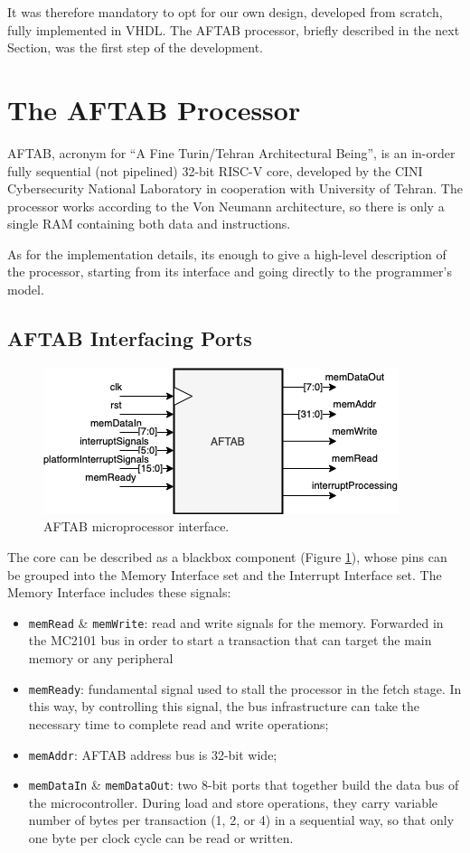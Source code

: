 It was therefore mandatory to opt for our own design, developed from scratch, fully implemented in VHDL. The AFTAB processor, briefly described in the next Section, was the first step of the development.

\section{The AFTAB Processor}
AFTAB, acronym for ``A Fine Turin/Tehran Architectural Being'', is an in-order fully sequential (not pipelined) 32-bit RISC-V core, developed by the CINI Cybersecurity National Laboratory in cooperation with University of Tehran. The processor works according to the Von Neumann architecture, so there is only a single RAM containing both data and instructions.

As for the implementation details, its enough to give a high-level description of the processor, starting from its interface and going directly to the programmer's model.
\subsection{AFTAB Interfacing Ports}

\begin{figure}[h!]
\vspace{0.5cm}
\includegraphics[scale=0.9]{./images/aftabpins}
\caption{AFTAB microprocessor interface.}
\label{fig:aftabpin} %
\end{figure}

The core can be described as a blackbox component (Figure \ref{fig:aftabpin}), whose pins can be grouped into the Memory Interface set and the Interrupt Interface set. The Memory Interface includes these signals:

\begin{itemize}
\item \texttt{memRead} \& \texttt{memWrite}: read and write signals for the memory. Forwarded in the MC2101 bus in order to start a transaction that can target the main memory or any peripheral
\item \texttt{memReady}: fundamental signal used to stall the processor in the fetch stage. In this way, by controlling this signal, the bus infrastructure can take the necessary time to complete read and write operations;
\item \texttt{memAddr}: AFTAB address bus is 32-bit wide;
\item \texttt{memDataIn} \& \texttt{memDataOut}: two 8-bit ports that together build the data bus of the microcontroller. During load and store operations, they carry variable number of bytes per transaction (1, 2, or 4) in a sequential way, so that only one byte per clock cycle can be read or written.
\end{itemize}

